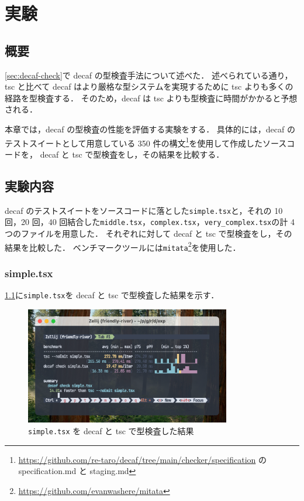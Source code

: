 \chapter{実験}

\section{概要}

\ref{sec:decaf-check}で decaf の型検査手法について述べた．
述べられている通り，tsc と比べて decaf はより厳格な型システムを実現するために tsc よりも多くの経路を型検査する．
そのため，decaf は tsc よりも型検査に時間がかかると予想される．

本章では，decaf の型検査の性能を評価する実験をする．
具体的には，decaf のテストスイートとして用意している 350 件の構文\footnote{\url{https://github.com/re-taro/decaf/tree/main/checker/specification} の specification.md と staging.md}を使用して作成したソースコードを，
decaf と tsc で型検査をし，その結果を比較する．

\section{実験内容}

decaf のテストスイートをソースコードに落とした\texttt{simple.tsx}と，それの 10 回，20 回，40 回結合した\texttt{middle.tsx}，\texttt{complex.tsx}，\texttt{very\_complex.tsx}の計 4 つのファイルを用意した．
それぞれに対して decaf と tsc で型検査をし，その結果を比較した．
ベンチマークツールには\texttt{mitata}\footnote{\url{https://github.com/evanwashere/mitata}}を使用した．

\subsection{simple.tsx}
\label{sec:simple}

\ref{fig:simple}に\texttt{simple.tsx}を decaf と tsc で型検査した結果を示す．

\begin{figure}[H]
    \centering
    \includegraphics[width=0.8\textwidth]{figures/fig_exp_1_simple_tsx.png}
    \caption{\texttt{simple.tsx} を decaf と tsc で型検査した結果}
    \label{fig:simple}
\end{figure}

